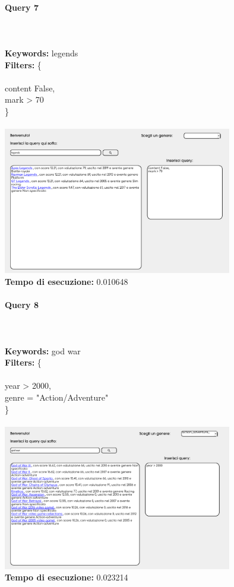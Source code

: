 \documentclass[12pt]{article}
\begin{document}
\paragraph{Query 7} ~ \\ \\

\noindent \textbf{Keywords: } legends \\
\textbf{Filters: } \{ \\ \\
\indent content False, \\
\indent mark > 70 \\
\} \\\\

\noindent \includegraphics[width=100mm]{Immagini/Image7.png} \\
\textbf{Tempo di esecuzione:} 0.010648 \\
\pagebreak

\paragraph{Query 8} ~ \\ \\

\noindent \textbf{Keywords: } god war \\
\textbf{Filters: } \{ \\ \\
\indent year > 2000, \\
\indent genre = "Action/Adventure" \\
\} \\\\

\noindent \includegraphics[width=100mm]{Immagini/Image8.png} \\
\textbf{Tempo di esecuzione:} 0.023214 \\
\pagebreak
\end{document}
